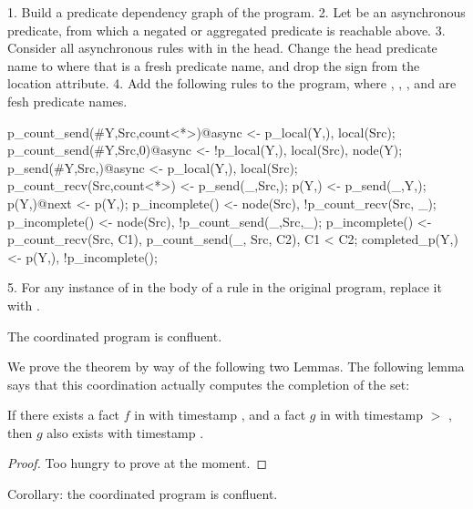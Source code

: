 1. Build a predicate dependency graph of the program. 
2. Let  be an asynchronous predicate, from which a negated or aggregated predicate is reachable above.
3. Consider all asynchronous rules with  in the head.  Change the head predicate name to  where that is a fresh predicate name, and drop the \dedalus{\#} sign from the location attribute.
4. Add the following rules to the program, where , , , and  are fesh predicate names.

\noindent
\begin{Dedalus}
p_count_send(#Y,Src,count<*>)@async <- p_local(Y,),
                                       local(Src);
p_count_send(#Y,Src,0)@async <- !p_local(Y,\dbar{_}), local(Src),
                                node(Y);
p_send(#Y,Src,)@async <- p_local(Y,), local(Src);
p_count_recv(Src,count<*>) <- p_send(_,Src,);
p(Y,) <- p_send(_,Y,);
p(Y,)@next <- p(Y,);
p_incomplete() <- node(Src), !p_count_recv(Src, _);
p_incomplete() <- node(Src), !p_count_send(_,Src,_);
p_incomplete() <- p_count_recv(Src, C1),
                  p_count_send(_, Src, C2), C1 < C2;
completed_p(Y,) <- p(Y,), !p_incomplete();
\end{Dedalus}

5. For any instance of  in the body of a rule in the original program, replace it with .

\begin{theorem}
The coordinated program is confluent.
\end{theorem}

We prove the theorem by way of the following two Lemmas.
The following lemma says that this coordination actually computes the completion of the set:

\begin{lemma}
If there exists a fact $f$ in  with timestamp , and a fact $g$ in  with timestamp  $>$ , then $g$ also exists with timestamp .
\end{lemma}
\begin{proof}
Too hungry to prove at the moment.
\end{proof}

Corollary: the coordinated program is confluent.

